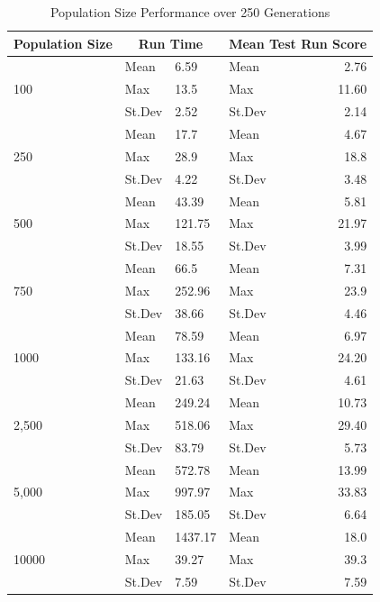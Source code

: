 \documentclass{article}
\begin{document}
\begin{table}[h]
\begin{center}
\begin{tabular}{|l|l|l|l|r|}
\hline%
\textbf{Population Size} & \multicolumn{2}{c|}{\textbf{Run Time}} & \multicolumn{2}{c|}{\textbf{Mean Test Run Score}} \\
\hline
\multirow{3}{*}{100}
& Mean & 6.59 & Mean & 2.76 \\
& Max & 13.5 & Max & 11.60 \\
& St.Dev & 2.52 & St.Dev & 2.14 \\
\hline
\multirow{3}{*}{250}
& Mean & 17.7 & Mean & 4.67 \\
& Max & 28.9 & Max & 18.8 \\
& St.Dev & 4.22 & St.Dev & 3.48 \\
\hline
\multirow{3}{*}{500}
& Mean & 43.39 & Mean & 5.81 \\
& Max & 121.75 & Max & 21.97 \\
& St.Dev & 18.55 & St.Dev & 3.99 \\
\hline
\multirow{3}{*}{750}
& Mean & 66.5 & Mean & 7.31 \\
& Max & 252.96 & Max & 23.9 \\
& St.Dev & 38.66 & St.Dev & 4.46 \\
\hline
\multirow{3}{*}{1000}
& Mean & 78.59 & Mean & 6.97 \\
& Max & 133.16 & Max & 24.20 \\
& St.Dev & 21.63 & St.Dev & 4.61 \\
\hline
\multirow{3}{*}{2,500}
& Mean & 249.24 & Mean & 10.73 \\
& Max & 518.06 & Max & 29.40 \\
& St.Dev & 83.79 & St.Dev & 5.73 \\
\hline
\multirow{3}{*}{5,000}
& Mean & 572.78 & Mean & 13.99 \\
& Max & 997.97 & Max & 33.83 \\
& St.Dev & 185.05 & St.Dev & 6.64 \\
\hline
\multirow{3}{*}{10000}
& Mean & 1437.17 & Mean & 18.0 \\
& Max & 39.27 & Max & 39.3 \\
& St.Dev & 7.59 & St.Dev & 7.59 \\
\hline
\end{tabular}
\end{center}
\caption{Population Size Performance over 250 Generations}
\label{table:population_size}
\end{table}
\end{document}

